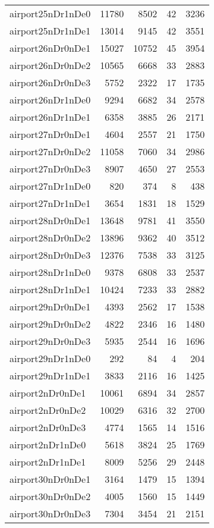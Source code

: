 \begin{tabular}{lrrrr}
airport25nDr1nDe0 & 11780 & 8502 & 42 & 3236 \\
airport25nDr1nDe1 & 13014 & 9145 & 42 & 3551 \\
airport26nDr0nDe1 & 15027 & 10752 & 45 & 3954 \\
airport26nDr0nDe2 & 10565 & 6668 & 33 & 2883 \\
airport26nDr0nDe3 & 5752 & 2322 & 17 & 1735 \\
airport26nDr1nDe0 & 9294 & 6682 & 34 & 2578 \\
airport26nDr1nDe1 & 6358 & 3885 & 26 & 2171 \\
airport27nDr0nDe1 & 4604 & 2557 & 21 & 1750 \\
airport27nDr0nDe2 & 11058 & 7060 & 34 & 2986 \\
airport27nDr0nDe3 & 8907 & 4650 & 27 & 2553 \\
airport27nDr1nDe0 & 820 & 374 & 8 & 438 \\
airport27nDr1nDe1 & 3654 & 1831 & 18 & 1529 \\
airport28nDr0nDe1 & 13648 & 9781 & 41 & 3550 \\
airport28nDr0nDe2 & 13896 & 9362 & 40 & 3512 \\
airport28nDr0nDe3 & 12376 & 7538 & 33 & 3125 \\
airport28nDr1nDe0 & 9378 & 6808 & 33 & 2537 \\
airport28nDr1nDe1 & 10424 & 7233 & 33 & 2882 \\
airport29nDr0nDe1 & 4393 & 2562 & 17 & 1538 \\
airport29nDr0nDe2 & 4822 & 2346 & 16 & 1480 \\
airport29nDr0nDe3 & 5935 & 2544 & 16 & 1696 \\
airport29nDr1nDe0 & 292 & 84 & 4 & 204 \\
airport29nDr1nDe1 & 3833 & 2116 & 16 & 1425 \\
airport2nDr0nDe1 & 10061 & 6894 & 34 & 2857 \\
airport2nDr0nDe2 & 10029 & 6316 & 32 & 2700 \\
airport2nDr0nDe3 & 4774 & 1565 & 14 & 1516 \\
airport2nDr1nDe0 & 5618 & 3824 & 25 & 1769 \\
airport2nDr1nDe1 & 8009 & 5256 & 29 & 2448 \\
airport30nDr0nDe1 & 3164 & 1479 & 15 & 1394 \\
airport30nDr0nDe2 & 4005 & 1560 & 15 & 1449 \\
airport30nDr0nDe3 & 7304 & 3454 & 21 & 2151 \\

\end{tabular}
